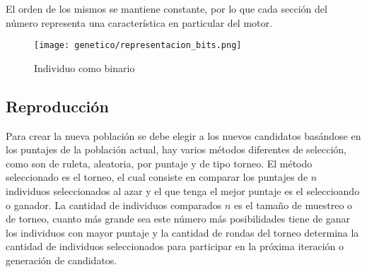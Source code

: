 El orden de los mismos se mantiene constante, por lo que cada sección del número
representa una característica en particular del motor.
%

\begin{figure}[ht]
  \centering
  \texttt{[image: genetico/representacion\_bits.png]}
  \caption{Individuo como binario}\label{fig:pop_bit}
\end{figure}






\subsection{Reproducción}

Para crear la nueva población se debe elegir a los nuevos candidatos basándose
en los puntajes de la población actual, hay varios métodos diferentes de
selección, como son de ruleta, aleatoria, por puntaje y de tipo torneo.
%
El método seleccionado es el torneo, el cual consiste en comparar los puntajes
de $n$ individuos seleccionados al azar y el que tenga el mejor puntaje es el
seleccioando o ganador.
%
La cantidad de individuos comparados $n$ es el tamaño de muestreo o de torneo,
cuanto más grande sea este número más posibilidades tiene de ganar los
individuos con mayor puntaje y la cantidad de rondas del torneo determina la
cantidad de individuos seleccionados para participar en la próxima iteración o
generación de candidatos.


